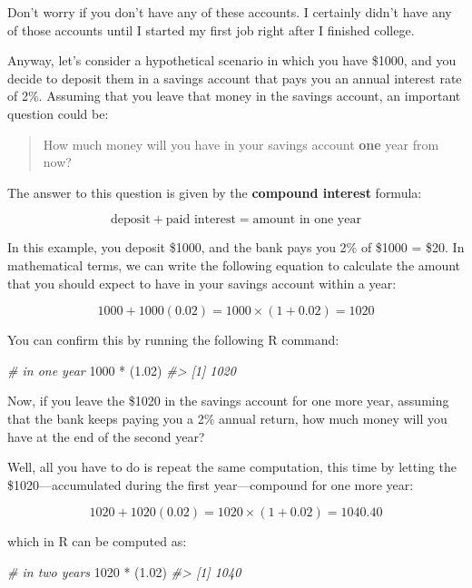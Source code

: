 \documentclass[
]{book}
\newenvironment{Shaded}{\begin{snugshade}}{\end{snugshade}}
\newcommand{\CommentTok}[1]{\textcolor[rgb]{0.56,0.35,0.01}{\textit{#1}}}
\newcommand{\DecValTok}[1]{\textcolor[rgb]{0.00,0.00,0.81}{#1}}
\newcommand{\FloatTok}[1]{\textcolor[rgb]{0.00,0.00,0.81}{#1}}
\newcommand{\NormalTok}[1]{#1}
\newcommand{\SpecialCharTok}[1]{\textcolor[rgb]{0.00,0.00,0.00}{#1}}
\begin{document}
Don't worry if you don't have any of these accounts. I certainly didn't have
any of those accounts until I started my first job right after I finished college.

Anyway, let's consider a hypothetical scenario in which you have \$1000, and
you decide to deposit them in a savings account that pays you an annual
interest rate of 2\%. Assuming that you leave that money in the savings account,
an important question could be:

\begin{quote}
How much money will you have in your savings account \textbf{one} year from now?
\end{quote}

The answer to this question is given by the \textbf{compound interest} formula:

\[
\text{deposit} + \text{paid interest} = \text{amount in one year}
\]

In this example, you deposit \$1000, and the bank pays you 2\% of \$1000 = \$20.
In mathematical terms, we can write the following equation to calculate the
amount that you should expect to have in your savings account within a year:

\[
1000 + 1000 (0.02) = 1000 \times (1 + 0.02) = 1020
\]

You can confirm this by running the following R command:

\begin{Shaded}
\begin{Highlighting}[]
\CommentTok{\# in one year}
\DecValTok{1000} \SpecialCharTok{*}\NormalTok{ (}\FloatTok{1.02}\NormalTok{)}
\CommentTok{\#\textgreater{} [1] 1020}
\end{Highlighting}
\end{Shaded}

Now, if you leave the \$1020 in the savings account for one more year, assuming
that the bank keeps paying you a 2\% annual return, how much money will you have
at the end of the second year?

Well, all you have to do is repeat the same computation, this time by letting
the \$1020---accumulated during the first year---compound for one more year:

\[
1020 + 1020 (0.02) = 1020 \times (1 + 0.02) = 1040.40
\]

which in R can be computed as:

\begin{Shaded}
\begin{Highlighting}[]
\CommentTok{\# in two years}
\DecValTok{1020} \SpecialCharTok{*}\NormalTok{ (}\FloatTok{1.02}\NormalTok{)}
\CommentTok{\#\textgreater{} [1] 1040}
\end{Highlighting}
\end{Shaded}
\end{document}
